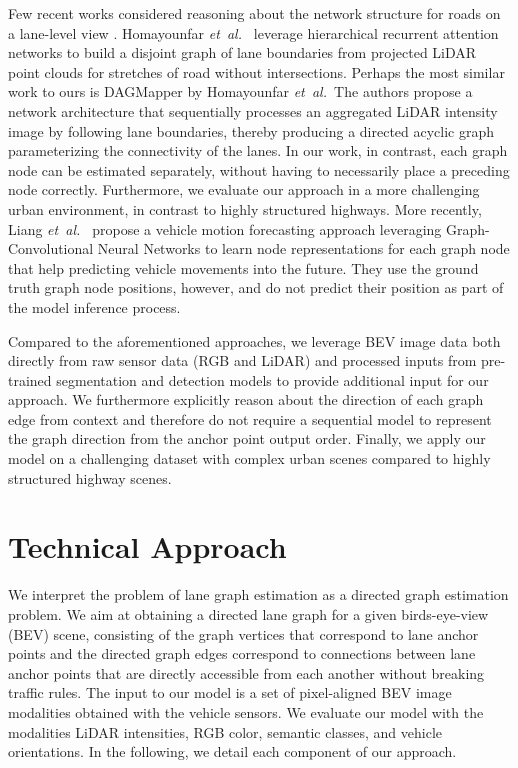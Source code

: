 \documentclass[letterpaper, 10 pt, conference]{ieeeconf}
\newcommand{\etal}{\emph{et~al.~}}
\begin{document}
Few recent works considered reasoning about the network structure for roads on a lane-level view \cite{homayounfar2018hierarchical, homayounfar2019dagmapper, sela20203d, liang2020learning}. Homayounfar \etal \cite{homayounfar2018hierarchical} leverage hierarchical recurrent attention networks to build a disjoint graph of lane boundaries from projected LiDAR point clouds for stretches of road without intersections.
Perhaps the most similar work to ours is DAGMapper \cite{homayounfar2019dagmapper} by Homayounfar \etal The authors propose a network architecture that sequentially processes an aggregated LiDAR intensity image by following lane boundaries, thereby producing a directed acyclic graph parameterizing the connectivity of the lanes. In our work, in contrast, each graph node can be estimated separately, without having to necessarily place a preceding node correctly. Furthermore, we evaluate our approach in a more challenging urban environment, in contrast to highly structured highways. More recently, Liang \etal \cite{liang2020learning} propose a vehicle motion forecasting approach leveraging Graph-Convolutional Neural Networks to learn node representations for each graph node that help predicting vehicle movements into the future. They use the ground truth graph node positions, however, and do not predict their position as part of the model inference process.


Compared to the aforementioned approaches, we leverage BEV image data both directly from raw sensor data (RGB and LiDAR) and processed inputs from pre-trained segmentation and detection models to provide additional input for our approach. We furthermore explicitly reason about the direction of each graph edge from context and therefore do not require a sequential model  to represent the graph direction from the anchor point output order. Finally, we apply our model on a challenging dataset with complex urban scenes compared to highly structured highway scenes.

 
\section{Technical Approach}
\label{sec:approach}


We interpret the problem of lane graph estimation as a directed graph estimation problem. We aim at obtaining a directed lane graph  for a given birds-eye-view (BEV) scene, consisting of the graph vertices  that correspond to lane anchor points and the directed graph edges  correspond to connections between lane anchor points that are directly accessible from each another without breaking traffic rules. The input to our model is a set of pixel-aligned BEV image modalities obtained with the vehicle sensors. We evaluate our model with the modalities LiDAR intensities, RGB color, semantic classes, and vehicle orientations. In the following, we detail each component of our approach.
\end{document}
